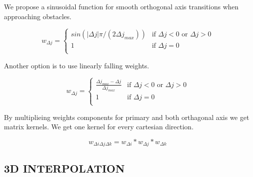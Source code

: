 \documentclass[letterpaper, 10 pt, conference]{ieeeconf}  %
\begin{document}
%

We propose a sinusoidal function for smooth orthogonal axis transitions when approaching obstacles.

\begin{equation}
	w_{\Delta j} =
	\begin{cases} 
		sin(\left| \Delta j \right| \pi / (2 \Delta j_{max})) & \text{if } \Delta j < 0 \text{~or }  \Delta j > 0 \\
		1 & \text{if } \Delta j = 0 \\
	\end{cases}
\end{equation}

Another option is to use linearly falling weights.

\begin{equation}
	w_{\Delta j} =
	\begin{cases} 
		\frac{\Delta j_{max} - \Delta j }{\Delta j_{max}} & \text{if } \Delta j < 0 \text{~or }  \Delta j > 0 \\
		1 & \text{if } \Delta j = 0 \\
	\end{cases}
\end{equation}


By multiplieing weights components for primary and both orthagonal axis we get matrix kernels. We get one kernel for every cartesian direction.

\begin{equation}
	w_{\Delta i \Delta j \Delta k} = w_{\Delta i} * w_{\Delta j} * w_{\Delta k}
\end{equation}

\subsection{3D INTERPOLATION} 
\end{document}
